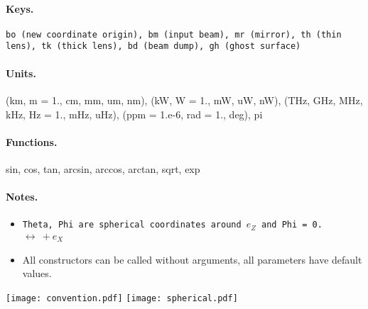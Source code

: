 \documentclass[a4paper, landscape]{article}
\begin{document}
\begin{multicols}{3}
\paragraph{Keys.} \tt{bo} (new coordinate origin), \tt{bm} (input beam), \tt{mr} (mirror), \tt{th}  (thin lens), \tt{tk} (thick lens), \tt{bd} (beam dump), \tt{gh} (ghost surface)
\paragraph{Units.}(km, m = 1., cm, mm, um, nm), (kW, W = 1., mW, uW, nW), (THz, GHz, MHz, kHz, Hz = 1., mHz, uHz), (ppm = 1.e-6, rad = 1., deg), pi
\paragraph{Functions.} sin, cos, tan, arcsin, arccos, arctan, sqrt, exp


\paragraph{Notes.}\begin{itemize}
\item \tt{Theta}, \tt{Phi} are spherical coordinates around $e_Z$ and \tt{Phi = 0.} $\leftrightarrow~ + e_X$
\item All constructors can be called without arguments, all parameters have default values.
\end{itemize}

\texttt{[image: convention.pdf]}
\texttt{[image: spherical.pdf]}



\end{multicols}
\end{document}
